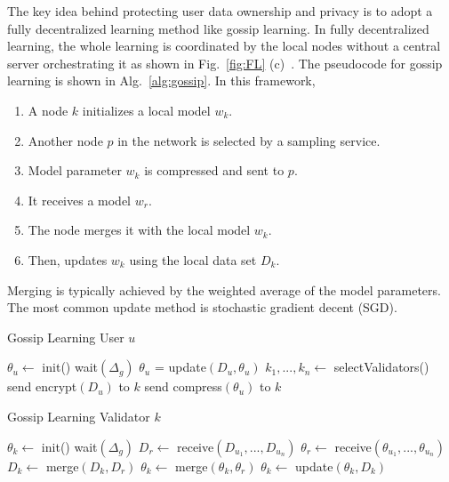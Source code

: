 \documentclass[11pt,letterpaper]{article}
\begin{document}
The key idea behind protecting user data ownership and privacy is to adopt a fully decentralized learning method like gossip learning. In fully decentralized learning, the whole learning is coordinated by the local nodes without a central server orchestrating it as shown in Fig.~\ref{fig:FL} (c)~\cite{lalitha2018fully}. The pseudocode for gossip learning is shown in Alg.~\ref{alg:gossip}. In this framework, 
\begin{enumerate}
  \item A node $k$ initializes a local model $w_k$.
  \item Another node $p$ in the network is selected by a sampling service.
  \item Model parameter $w_k$ is compressed and sent to $p$. 
  \item It receives a model $w_r$.
  \item The node merges it with the local model $w_k$. 
  \item Then, updates $w_k$ using the local data set $D_k$.
\end{enumerate}
Merging is typically achieved by the weighted average of the model parameters. The most common update method is stochastic gradient decent (SGD).

\begin{algorithm}
\caption{Gossip Learning User $u$}\label{alg:gossip_client}
\begin{algorithmic}[1]
\State $\theta_u \gets$ init()
\Loop
    \State wait$(\Delta_g)$     
    \State $\theta_u$ = update$(D_u, \theta_u)$       
    \State $k_1,...,k_n \leftarrow$ selectValidators()   
    \State send encrypt$(D_u)$ to $k$
    \State send compress$(\theta_u)$ to $k$
\EndLoop
\end{algorithmic}
\end{algorithm}

\begin{algorithm}
\caption{Gossip Learning Validator $k$}\label{alg:gossip_validator}
\begin{algorithmic}[1]
\State $\theta_k \gets$ init()
\Loop
    \State wait$(\Delta_g)$     
    \State $D_r \gets$ receive$(D_{u_1},...,D_{u_n})$ 
    \State $\theta_r \gets$ receive$(\theta_{u_1},...,\theta_{u_n})$ 
    \State $D_k \gets$ merge$(D_k,D_r)$
    \State $\theta_k \gets$ merge$(\theta_k,\theta_r)$
    \State $\theta_k \gets$ update$(\theta_k,D_k)$
\EndLoop
\end{algorithmic}
\end{algorithm}
\end{document}
